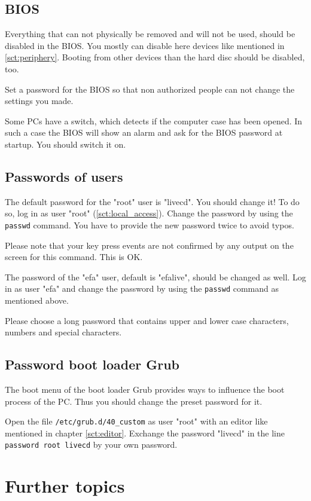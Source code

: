 \documentclass[a4paper,12pt,twoside]{article}
\begin{document}
\subsection{BIOS}
\label{sct:bios}
Everything that can not physically be removed and will not be used,
should be disabled in the BIOS. You mostly can disable here devices
like mentioned in \ref{sct:periphery}. Booting from other devices than 
the hard disc should be disabled, too.

Set a password for the BIOS so that non authorized people can not change
the settings you made.

Some PCs have a switch, which detects if the computer case has been
opened. In such a case the BIOS will show an alarm and ask for the BIOS
password at startup. You should switch it on.


\subsection{Passwords of users}
\label{sct:password_admin}
The default password for the "root" user is
"livecd". You should change it! To do so,
log in as user "root" (\ref{sct:local_access}). Change the
password by using the \texttt{passwd} command. You
have to provide the new password twice to avoid typos.

Please note that your key press events are not confirmed by any output
on the screen for this command. This is OK.

The password of the "efa" user, default is "efalive", should be changed as well. 
Log in as user "efa" and change the password by using the \texttt{passwd} command
as mentioned above.

Please choose a long password that contains upper and lower case
characters, numbers and special characters.


\subsection{Password boot loader Grub}
\label{sct:password_grub}
The boot menu of the boot loader Grub \cite{GRB1} provides ways to
influence the boot process of the PC. Thus you should change the preset
password for it.

Open the file \texttt{/etc/grub.d/40\_custom} as user
"root" with an editor like mentioned in
chapter \ref{sct:editor}. Exchange the password "livecd"
in the line \texttt{password root livecd} by your
own password.


\section{Further topics}
\label{sct:further_topics}
\end{document}
